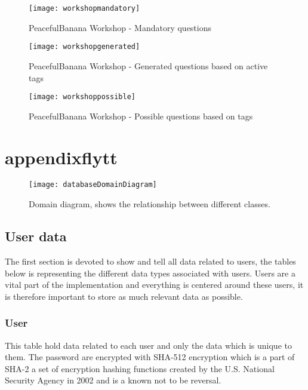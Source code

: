 \begin{figure}[H]
    \centering
        \texttt{[image: workshopmandatory]}
    \caption{PeacefulBanana Workshop - Mandatory questions}
    \label{workshopmandatoryfunc}
\end{figure}
\begin{figure}[H]
    \centering
        \texttt{[image: workshopgenerated]}
    \caption{PeacefulBanana Workshop - Generated questions based on active tags}
    \label{workshopgeneratedfunc}
\end{figure}
\begin{figure}[H]
    \centering
        \texttt{[image: workshoppossible]}
    \caption{PeacefulBanana Workshop - Possible questions based on tags}
    \label{workshoppossiblefunc}
\end{figure}

\section{appendixflytt}
\begin{figure}[H]
\centering
	\texttt{[image: databaseDomainDiagram]}
\caption{Domain diagram, shows the relationship between different classes.}
\label{databaseDomainDiagram}
\end{figure}

\subsection{User data}
The first section is devoted to show and tell all data related to users, the tables below is representing the different data types associated with users. Users are a vital part of the implementation and everything is centered around these users, it is therefore important to store as much relevant data as possible. \\

\subsubsection*{User}
This table hold data related to each user and only the data which is unique to them.
The password are encrypted with SHA-512 encryption which is a part of SHA-2 a set of encryption hashing functions created by the U.S. National Security Agency in 2002 and is a known not to be reversal.\\

